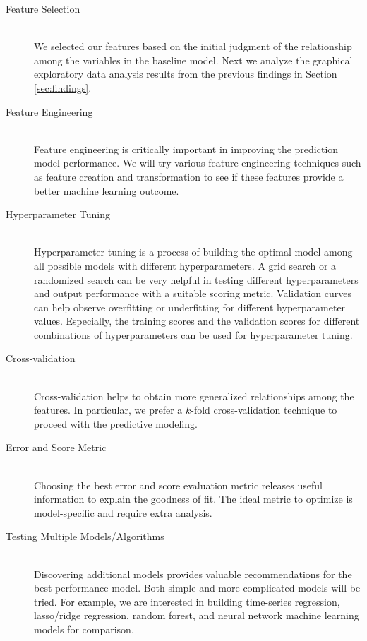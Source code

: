 \documentclass[11pt, letterpaper]{article}
\begin{document}
\begin{description}
  \item[Feature Selection] \hfill \\ We selected our features based on the initial judgment of the relationship among the variables in the baseline model. Next we analyze the graphical exploratory data analysis results from the previous findings in Section \ref{sec:findings}.
  \item[Feature Engineering] \hfill \\ Feature engineering is critically important in improving the prediction model performance. We will try various feature engineering techniques such as feature creation and transformation to see if these features provide a better machine learning outcome.
  \item[Hyperparameter Tuning] \hfill \\ Hyperparameter tuning is a process of building the optimal model among all possible models with different hyperparameters. A grid search or a randomized search can be very helpful in testing different hyperparameters and output performance with a suitable scoring metric. Validation curves can help observe overfitting or underfitting for different hyperparameter values. Especially, the training scores and the validation scores for different combinations of hyperparameters can be used for hyperparameter tuning.
  \item[Cross-validation] \hfill \\ Cross-validation helps to obtain more generalized relationships among the features. In particular, we prefer a $k$-fold cross-validation technique to proceed with the predictive modeling.
  \item[Error and Score Metric] \hfill \\ Choosing the best error and score evaluation metric releases useful information to explain the goodness of fit. The ideal metric to optimize is model-specific and require extra analysis.
  \item[Testing Multiple Models/Algorithms] \hfill \\ Discovering additional models provides valuable recommendations for the best performance model. Both simple and more complicated models will be tried. For example, we are interested in building time-series regression, lasso/ridge regression, random forest, and neural network machine learning models for comparison.

\end{description}



\end{document}
